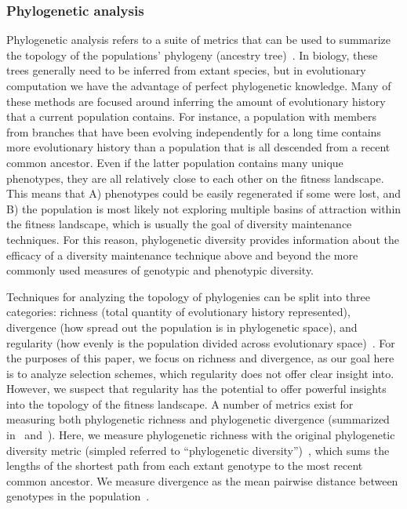 \subsubsection{Phylogenetic analysis}
Phylogenetic analysis refers to a suite of metrics that can be used to summarize the topology of the populations' phylogeny (ancestry tree)~\cite{winter_phylogenetic_2013}. In biology, these trees generally need to be inferred from extant species, but in evolutionary computation we have the advantage of perfect phylogenetic knowledge. Many of these methods are focused around inferring the amount of evolutionary history that a current population contains. For instance, a population with members from branches that have been evolving independently for a long time contains more evolutionary history than a population that is all descended from a recent common ancestor. %
Even if the latter population contains many unique phenotypes, they are all relatively close to each other on the fitness landscape. This means that A) phenotypes could be easily regenerated if some were lost, and B) the population is most likely not exploring multiple basins of attraction within the fitness landscape, which is usually the goal of diversity maintenance techniques. For this reason, phylogenetic diversity provides information about the efficacy of a diversity maintenance technique above and beyond the more commonly used measures of genotypic and phenotypic diversity.

Techniques for analyzing the topology of phylogenies can be split into three categories: richness (total quantity of evolutionary history represented), divergence (how spread out the population is in phylogenetic space), and regularity (how evenly is the population divided across evolutionary space)~\cite{tucker_guide_2017}. For the purposes of this paper, we focus on richness and divergence, as our goal here is to analyze selection schemes, which regularity does not offer clear insight into. However, we suspect that regularity has the potential to offer powerful insights into the topology of the fitness landscape. A number of metrics exist for measuring both phylogenetic richness and phylogenetic divergence (summarized in~\cite{winter_phylogenetic_2013} and~\cite{tucker_guide_2017}). Here, we measure phylogenetic richness with the original phylogenetic diversity metric (simpled referred to ``phylogenetic diversity'')~\cite{faith_conservation_1992},  which sums the lengths of the shortest path from each extant genotype to the most recent common ancestor. We measure divergence as the mean pairwise distance between genotypes in the population~\cite{webb_exploring_2000}.  

